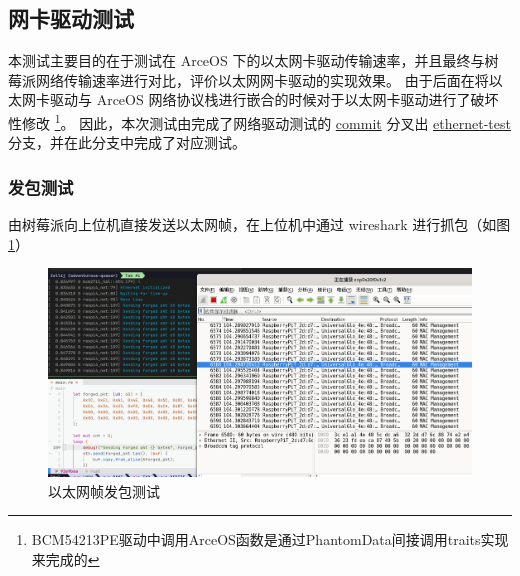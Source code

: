 

    \subsection{网卡驱动测试}

    本测试主要目的在于测试在 ArceOS 下的以太网卡驱动传输速率，并且最终与树莓派网络传输速率进行对比，评价以太网网卡驱动的实现效果。
    由于后面在将以太网卡驱动与 ArceOS 网络协议栈进行嵌合的时候对于以太网卡驱动进行了破坏性修改
    \footnote{BCM54213PE驱动中调用ArceOS函数是通过PhantomData间接调用traits实现来完成的}。
    因此，本次测试由完成了网络驱动测试的 \href{https://bitbucket.org/jackyliu16/arceos/commits/92e9b6abcdf180359381088552688c0fcbc83bf2}{commit} 
    分叉出 \href{https://bitbucket.org/jackyliu16/arceos/commits/branch/ethernet-test}{ethernet-test}
    分支，并在此分支中完成了对应测试。

    \subsubsection{发包测试}

    由树莓派向上位机直接发送以太网帧，在上位机中通过 wireshark 进行抓包（如图\ref{test::以太网帧发送}）

    \begin{figure}[ht]
        \centering
        \includegraphics[width=\textwidth]{./imgs/以太网帧通信正常.jpg}
        \caption{以太网帧发包测试}    \label{test::以太网帧发送}
    \end{figure}   

